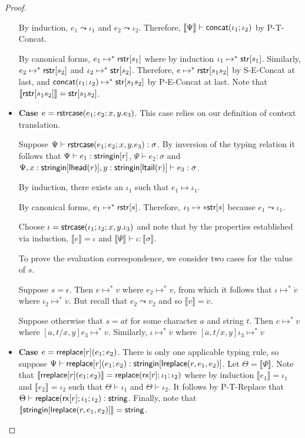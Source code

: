 \documentclass[11pt,leqno]{article}
\theoremstyle{definition}
\newcommand{\stringin}[1]{{\sf stringin}[#1]}
\renewcommand{\tstr}[1]{{{\sf str}[#1]}}
\newcommand{\treplace}[3]{{\sf replace}(#1;#2;#3)}
\newcommand{\tconcat}[2]{{\sf concat}(#1;#2)} \newcommand{\concat}[2]{{\sf concat}(#1;#2)} %
\newcommand{\rx}[1]{ {\sf rx}[#1] }
\newcommand{\str}{{\sf string}}
\newcommand{\lreplace}[3]{{\sf lreplace}(#1; #2; #3)}
\newcommand{\sctx}{\Psi} %
\newcommand{\tctx}{\Theta} %
\newcommand{\strcase}[3]{ {\sf rstrcase}(#1; #2; #3)}
\newcommand{\pstrcase}[3]{ {\sf strcase}(#1; #2; #3)}
\newcommand{\lhead}[1]{ {\sf lhead}(#1) }
\newcommand{\ltail}[1]{ {\sf ltail}(#1) }
\newcommand{\trden}[1]{\llbracket #1 \rrbracket} %
\renewcommand{\lreplace}[3]{{\sf lreplace}(#1, #2, #3)}
\begin{document}
\begin{proof}
\begin{itemize}[label=$ $, itemsep=1ex]
By induction, $e_1 \leadsto \iota_1$ and $e_2 \leadsto \iota_2$.
Therefore, $\trden{\sctx} \vdash \tconcat{\iota_1}{\iota_2}$ by P-T-Concat.

By canonical forms, $e_1 \mapsto^* {\sf rstr}[s_1]$ where by induction $\iota_1 \mapsto^* \tstr{s_1}$.
Similarly, $e_2 \mapsto^* {\sf rstr}[s_2]$ and $\iota_2 \mapsto^* \tstr{s_2}$.
Therefore, $e \mapsto^* {\sf rstr}[s_1s_2]$ by S-E-Concat at last, and $\tconcat{\iota_1}{\iota_2} \mapsto^* \tstr{s_1s_2}$ by P-E-Concat at last.
Note that $\trden{\rstr{s_1s_2}} = \tstr{s_1s_2}$.

\item \textbf{Case $e = \strcase{e_1}{e_2}{x,y.e_3}$}. This case relies on our definition
of context translation.

Suppose $\sctx \vdash \strcase{e_1}{e_2}{x,y.e_3} : \sigma$.
By inversion of the typing relation it follows that
$\sctx \vdash e_1 : \stringin{r}$, $\sctx \vdash e_2 : \sigma$ and $\sctx, x : \stringin{\lhead{r}}, y : \stringin{\ltail{r}} \vdash e_3 : \sigma$.

By induction, there exists an $\iota_1$ 
such that $e_1 \mapsto \iota_1$.

By canonical forms, $e_1 \mapsto^* {\sf rstr}[s]$. Therefore, $\iota_1 \mapsto* \tstr{s}$ because $e_1 \leadsto \iota_1$.

Choose $\iota = \pstrcase{\iota_1}{\iota_2}{x,y.\iota_3}$ and note that by the properties established via induction,
$\trden{e} = \iota$ and $\trden{\sctx} \vdash \iota : \trden{\sigma}$.

To prove the evaluation correspondence, we consider two cases for the value of $s$.

Suppose $s = \epsilon$. Then $e \mapsto^* v$ where $e_2 \mapsto^* v$,
from which it follows that 
$\iota \mapsto^* \dot{v}$ where $\iota_2 \mapsto^* \dot{v}$.
But recall that $e_2 \leadsto v_2$ and so $\trden{v} = \dot{v}$.

Suppose otherwise that $s = at$ for some character $a$ and string $t$.
Then $e \mapsto^* v$ where $[a, t / x, y] e_3 \mapsto^* v$.
Similarly, $\iota \mapsto^* \dot{v}$ where $[a, t / x, y] \iota_3 \mapsto^* \dot{v}$

\item \textbf{Case $e = {\sf rreplace}[r](e_1;e_2)$}.
There is only one applicable typing rule, so suppose
$\sctx \vdash \rreplace{r}{e_1}{e_2} : \stringin{\lreplace{r}{e_1}{e_2}}$.
Let $\tctx = \trden{\sctx}$.
Note that $\trden{\rreplace{r}{e_1}{e_2}} = \treplace{\rx{r}}{\iota_1}{\iota_2}$
where by induction $\trden{e_1} = \iota_1$ and $\trden{e_2} = \iota_2$
such that $\tctx \vdash \iota_1$ and $\tctx \vdash \iota_2$.
It follows by P-T-Replace that $\tctx \vdash \treplace{\rx{r}}{\iota_1}{\iota_2} : \str$.
Finally, note that $\trden{\stringin{\lreplace{r}{e_1}{e_2}}} = \str$.


\end{itemize}
\end{proof}
\end{document}

